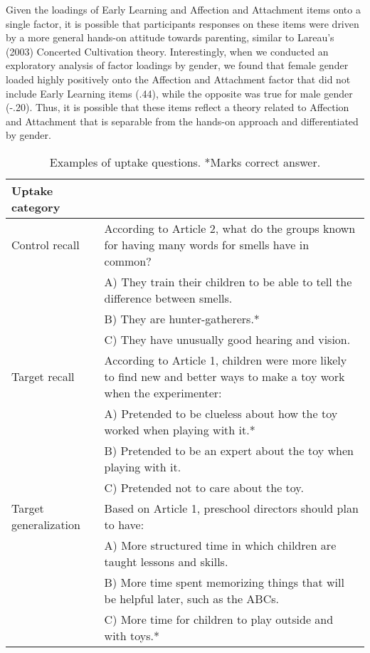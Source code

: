 \documentclass[10pt, letterpaper]{article}
\begin{document}
Given the loadings of Early Learning and Affection and Attachment items
onto a single factor, it is possible that participants responses on
these items were driven by a more general hands-on attitude towards
parenting, similar to Lareau's (2003) Concerted Cultivation theory.
Interestingly, when we conducted an exploratory analysis of factor
loadings by gender, we found that female gender loaded highly positively
onto the Affection and Attachment factor that did not include Early
Learning items (.44), while the opposite was true for male gender
(-.20). Thus, it is possible that these items reflect a theory related
to Affection and Attachment that is separable from the hands-on approach
and differentiated by gender.

\begin{table*}[!h]
\centering
\begin{tabular}{p{1.25in}p{5.25in}}
  \hline
Uptake category \\ 
  \hline
Control recall 
& According to Article 2, what do the groups known for having many words for smells have in common? \\ 
  & A) They train their children to be able to tell the difference between smells.\\ 
  & B) They are hunter-gatherers.*\\ 
  & C) They have unusually good hearing and vision.\\ 
\hline
Target recall
  & According to Article 1, children were more likely to find new and better ways to make a toy work when the experimenter:\\ 
  & A) Pretended to be clueless about how the toy worked when playing with it.*\\ 
  & B) Pretended to be an expert about the toy when playing with it.\\ 
  & C) Pretended not to care about the toy.\\ 
  \hline
  Target generalization 
  & Based on Article 1, preschool directors should plan to have:\\ 
  & A) More structured time in which children are taught lessons and skills.\\ 
  & B) More time spent memorizing things that will be helpful later, such as the ABCs.\\
  & C) More time for children to play outside and with toys.*\\
  \hline
\end{tabular}
\caption{Examples of uptake questions. *Marks correct answer. \label{tab:uptake}} 
\end{table*}
\end{document}
